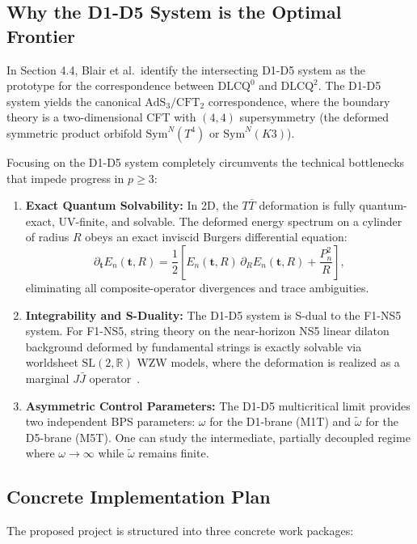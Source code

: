 \documentclass[11pt,a4paper]{article}
\begin{document}
\subsection{Why the D1-D5 System is the Optimal Frontier}
In Section 4.4, Blair et al.\ identify the intersecting D1-D5 system as the prototype for the correspondence between $\text{DLCQ}^0$ and $\text{DLCQ}^2$. The D1-D5 system yields the canonical $\text{AdS}_3/\text{CFT}_2$ correspondence, where the boundary theory is a two-dimensional CFT with $(4,4)$ supersymmetry (the deformed symmetric product orbifold $\mathrm{Sym}^N(T^4)$ or $\mathrm{Sym}^N(K3)$).

Focusing on the D1-D5 system completely circumvents the technical bottlenecks that impede progress in $p \ge 3$:
\begin{enumerate}
    \item \textbf{Exact Quantum Solvability:} In 2D, the $T\bar{T}$ deformation is fully quantum-exact, UV-finite, and solvable. The deformed energy spectrum on a cylinder of radius $R$ obeys an exact inviscid Burgers differential equation:
    \begin{equation}
        \partial_\mathbf{t} E_n(\mathbf{t}, R) = \frac{1}{2} \left[ E_n(\mathbf{t}, R) \, \partial_R E_n(\mathbf{t}, R) + \frac{P_n^2}{R} \right],
    \end{equation}
    eliminating all composite-operator divergences and trace ambiguities.
    \item \textbf{Integrability and S-Duality:} The D1-D5 system is S-dual to the F1-NS5 system. For F1-NS5, string theory on the near-horizon NS5 linear dilaton background deformed by fundamental strings is exactly solvable via worldsheet $\mathrm{SL}(2,\mathbb{R})$ WZW models, where the deformation is realized as a marginal $J\bar{J}$ operator~\cite{Giveon:2017nie}.
    \item \textbf{Asymmetric Control Parameters:} The D1-D5 multicritical limit provides two independent BPS parameters: $\omega$ for the D1-brane (M1T) and $\tilde{\omega}$ for the D5-brane (M5T). One can study the intermediate, partially decoupled regime where $\omega \to \infty$ while $\tilde{\omega}$ remains finite.
\end{enumerate}

\subsection{Concrete Implementation Plan}
The proposed project is structured into three concrete work packages:
\end{document}
